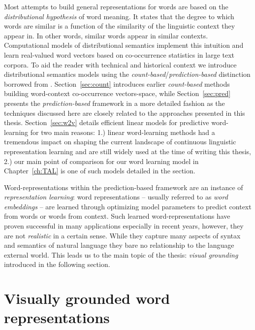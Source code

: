Most attempts to build  general representations for words are based on the
\emph{distributional hypothesis} of word meaning. It states that the degree to which words are similar
is a function of the similarity of the linguistic context they appear in. In other words, similar
words appear in similar contexts. Computational models of distributional
semantics implement this intuition and learn real-valued word vectors based on co-occurrence
statistics in large text corpora. 
To aid the reader with technical and historical context we introduce distributional
semantics models using the \emph{count-based}/\emph{prediction-based} distinction
borrowed from \cite{baroni2014don}.
Section~\ref{sec:count} introduces earlier \emph{count-based}
methods building word-context co-occurrence vectors-space, while
Section~\ref{sec:pred} presents the  \emph{prediction-based} framework in a more
detailed fashion as the techniques discussed here are closely related
to the approaches presented in this thesis.
Section~\ref{sec:w2v} details efficient linear
models for predictive word-learning for two main reasons: 1.) linear word-learning methods
had a tremendous impact
on shaping the current landscape of continuous linguistic representation learning and are still
widely used at the time of writing this thesis, 2.) our main point of comparison for
our word learning model in Chapter~\ref{ch:TAL} is one of such models detailed in the section.

Word-representations within the prediction-based framework 
are an instance of \emph{representation learning}:
word representations -- usually referred to as \emph{word embeddings} -- are learned through
optimizing model parameters to predict context from words or words from context.
Such learned word-representations have proven successful in many applications especially
in recent years, however, they are not \emph{realistic} in a certain sense. While they capture many
aspects of syntax and semantics of natural language they bare no relationship to the language external world.
This leads us to the main topic of the thesis:  \emph{visual grounding} introduced in the
following section.

\section{Visually grounded word representations}


